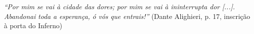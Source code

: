 
\begin{epigrafe}

    \textit{``Por mim se vai à cidade das dores; por mim se vai à ininterrupta dor [...].
        Abandonai toda a esperança, ó vós que entrais!''}
    (Dante Alighieri, p. 17, inscrição à porta do Inferno)

\end{epigrafe}

